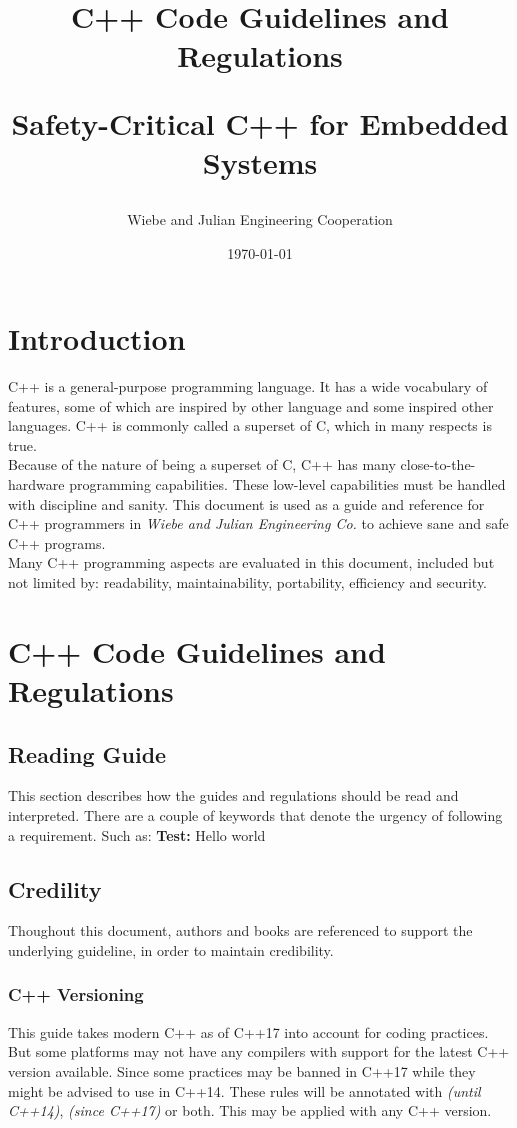 \documentclass[12pt]{article}
\title{
      C++ Code Guidelines and Regulations \\
      \begin{large}
         Safety-Critical C++ for Embedded Systems
      \end{large}
}
\date{\today}
\author{Wiebe and Julian Engineering Cooperation}
\newcommand{\cppuntil}[1]{\footnotesize\textit{(until C++#1)}\normalsize}
\newcommand{\cppsince}[1]{\footnotesize\textit{(since C++#1)}\normalsize}
\begin{document}
\maketitle

\newpage
{} %
\tableofcontents
\newpage
{} %

\newpage
\section{Introduction}
C++ is a general-purpose programming language. It has a wide vocabulary of
features, some of which are inspired by other language and some inspired other
languages. C++ is commonly called a superset of C, which in many respects
is true.\\
Because of the nature of being a superset of C, C++ has many close-to-the-
hardware programming capabilities. These low-level capabilities must be handled
with discipline and sanity. This document is used as a guide and reference for
C++ programmers in \textit{Wiebe and Julian Engineering Co.} to achieve sane and safe
C++ programs.\\
Many C++ programming aspects are evaluated in this document, included but not
limited by: readability, maintainability, portability, efficiency and security.
\newpage
\section{C++ Code Guidelines and Regulations}
\subsection{Reading Guide}
This section describes how the guides and regulations should be read and
interpreted. There are a couple of keywords that denote the urgency of
following a requirement. Such as:
\bigbreak
\textbf{Test:} Hello world
\subsection{Credility}
Thoughout this document, authors and books are referenced to support the
underlying guideline, in order to maintain credibility.
\subsubsection{C++ Versioning}
This guide takes modern C++ as of C++17 into account for coding practices. But
some platforms may not have any compilers with support for the latest C++
version available. Since some practices may be banned in C++17 while they might
be advised to use in C++14. These rules will be annotated with \cppuntil{14},
\cppsince{17} or both. This may be applied with any C++ version.

\newpage
\printbibliography

\newpage
\begin{appendix}
\end{appendix}
\end{document}
